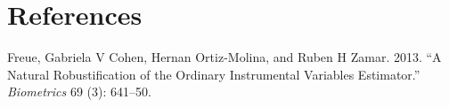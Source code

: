 \documentclass[
  12pt,
]{article}
\newlength{\cslhangindent}
\newenvironment{cslreferences}%
  {\setlength{\parindent}{0pt}%
  \everypar{\setlength{\hangindent}{\cslhangindent}}\ignorespaces}%
  {\par}
\begin{document}
\newpage

\hypertarget{references}{%
\section*{References}\label{references}}

\hypertarget{refs}{}
\begin{cslreferences}
\leavevmode\hypertarget{ref-freue2013}{}%
Freue, Gabriela V Cohen, Hernan Ortiz-Molina, and Ruben H Zamar. 2013. ``A Natural Robustification of the Ordinary Instrumental Variables Estimator.'' \emph{Biometrics} 69 (3): 641--50.
\end{cslreferences}
\end{document}
